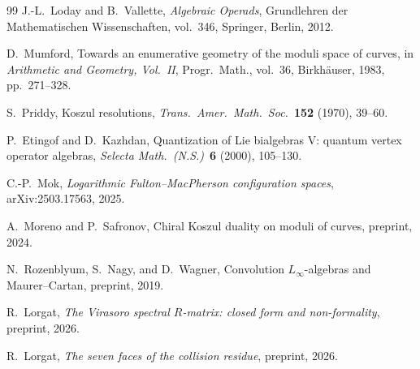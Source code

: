\documentclass[11pt,reqno]{amsart}
\theoremstyle{definition}
\theoremstyle{remark}
\numberwithin{equation}{section}
\begin{document}
\begin{thebibliography}{99}
J.-L.~Loday and B.~Vallette,
\textit{Algebraic Operads},
Grundlehren der Mathematischen Wissenschaften, vol.~346,
Springer, Berlin, 2012.

D.~Mumford,
Towards an enumerative geometry of the moduli space of curves,
in \textit{Arithmetic and Geometry, Vol.~II},
Progr.\ Math., vol.~36, Birkh\"auser, 1983, pp.~271--328.

S.~Priddy,
Koszul resolutions,
\textit{Trans.\ Amer.\ Math.\ Soc.}~\textbf{152} (1970), 39--60.

P.~Etingof and D.~Kazhdan,
Quantization of Lie bialgebras V: quantum vertex operator algebras,
\textit{Selecta Math.\ (N.S.)}~\textbf{6} (2000), 105--130.

C.-P.~Mok,
\emph{Logarithmic Fulton--MacPherson configuration spaces},
arXiv:2503.17563, 2025.

A.~Moreno and P.~Safronov,
Chiral Koszul duality on moduli of curves,
preprint, 2024.

N.~Rozenblyum, S.~Nagy, and D.~Wagner,
Convolution $L_\infty$-algebras and Maurer--Cartan,
preprint, 2019.

R.~Lorgat,
\textit{The Virasoro spectral $R$-matrix: closed form and non-formality},
preprint, 2026.

R.~Lorgat,
\textit{The seven faces of the collision residue},
preprint, 2026.

\end{thebibliography}
\end{document}
